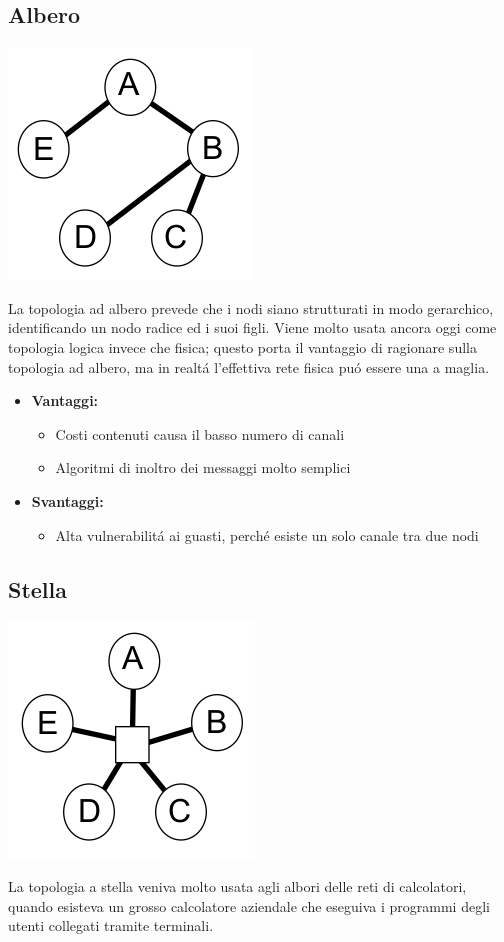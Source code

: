 \documentclass[12pt]{article}
\begin{document}
\subsection{Albero}\label{albero}
\begin{center}
	\includegraphics[scale=0.5]{introduzione-img5.png}
\end{center}
La topologia ad albero prevede che i nodi siano strutturati in modo gerarchico, identificando un nodo radice ed i suoi 
figli. Viene molto usata ancora oggi come topologia logica invece che fisica; questo porta il vantaggio di ragionare 
sulla topologia ad albero, ma in realt\'a l'effettiva rete fisica pu\'o essere una a maglia.
\begin{itemize}[noitemsep]
	\item \textbf{Vantaggi:}
	\begin{itemize}[noitemsep]
		\item Costi contenuti causa il basso numero di canali
		\item Algoritmi di inoltro dei messaggi molto semplici
	\end{itemize}
	\item \textbf{Svantaggi:}
	\begin{itemize}[noitemsep]
		\item Alta vulnerabilit\'a ai guasti, perch\'e esiste un solo canale tra due nodi
	\end{itemize}
\end{itemize}

\subsection{Stella}\label{stella}
\begin{center}
	\includegraphics[scale=0.5]{introduzione-img6.png}
\end{center}
La topologia a stella veniva molto usata agli albori delle reti di calcolatori, quando esisteva un grosso calcolatore 
aziendale che eseguiva i programmi degli utenti collegati tramite terminali.
\end{document}
